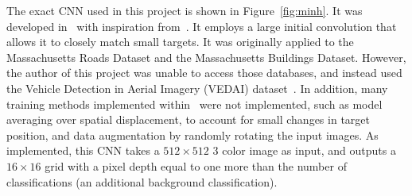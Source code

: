 \documentclass{article}
\begin{document}
The exact CNN used in this project is shown in Figure~\ref{fig:minh}. It was
developed in~\cite{saito_2016} with inspiration from~\cite{minh_thesis}. It employs a
large initial convolution that allows it to closely match small targets. It was
originally applied to the Massachusetts Roads Dataset and the Massachusetts
Buildings Dataset. However, the author of this project was unable to access
those databases, and instead used the Vehicle Detection in Aerial Imagery (VEDAI)
dataset~\cite{vedai_2015}. In addition, many training methods implemented
within~\cite{saito_2016} were not implemented, such as model averaging over
spatial displacement, to account for small changes in target position, and data
augmentation by randomly rotating the input images. As implemented, this CNN
takes a $512 \times 512$ 3 color image as input, and outputs a $16\times 16$
grid with a pixel depth equal to one more than the number of classifications (an
additional background classification).


\newpage
%  
%  


\end{document}
